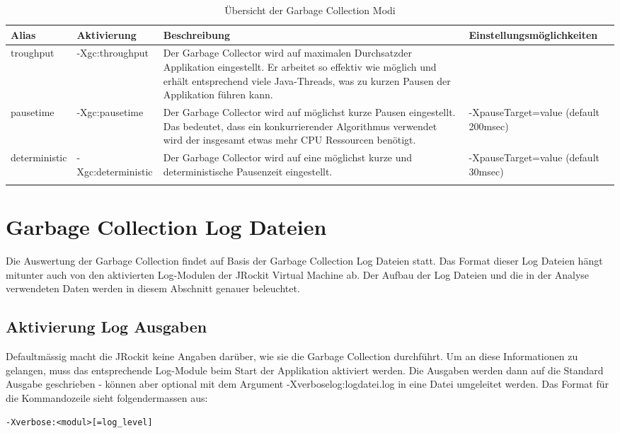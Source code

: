   \begin{longtable}{|p{2.5cm}|p{3.1cm}|p{4.5cm}|p{4cm}|}\hline
  \textbf{Alias} & \textbf{Aktivierung} & \textbf{Beschreibung} & Einstellungsmöglichkeiten\\\hline
  troughput & -Xgc:throughput & Der Garbage Collector wird auf maximalen Durchsatzder Applikation eingestellt. Er arbeitet so effektiv wie möglich und erhält entsprechend viele Java-Threads, was zu kurzen Pausen der Applikation führen kann. & \\\hline
  pausetime & -Xgc:pausetime & Der Garbage Collector wird auf möglichst kurze Pausen eingestellt. Das bedeutet, dass ein konkurrierender Algorithmus verwendet wird der insgesamt etwas mehr CPU Ressourcen benötigt. & -XpauseTarget=value (default 200msec)\\\hline
  deterministic & -Xgc:deterministic & Der Garbage Collector wird auf eine möglichst kurze und deterministische Pausenzeit eingestellt. &-XpauseTarget=value (default 30msec)\\\hline
    \caption{Übersicht der Garbage Collection Modi}
\end{longtable}

\section{Garbage Collection Log Dateien}\label{jrockitgclog}
Die Auswertung der Garbage Collection findet auf Basis der Garbage Collection Log Dateien statt. Das Format dieser Log Dateien hängt mitunter auch von den aktivierten Log-Modulen der JRockit Virtual Machine ab. Der Aufbau der Log Dateien und die in der Analyse verwendeten Daten werden in diesem Abschnitt genauer beleuchtet.

\subsection{Aktivierung Log Ausgaben}
Defaultmässig macht die JRockit keine Angaben darüber, wie sie die Garbage Collection durchführt. Um an diese Informationen zu gelangen, muss das entsprechende Log-Module beim Start der Applikation aktiviert werden. Die Ausgaben werden dann auf die Standard Ausgabe geschrieben - können aber optional mit dem Argument -Xverboselog:logdatei.log in eine Datei umgeleitet werden. Das Format für die Kommandozeile sieht folgendermassen aus:

\begin{lstlisting}[caption=Format Aktivierung Log Modul]
-Xverbose:<modul>[=log_level]
\end{lstlisting}

